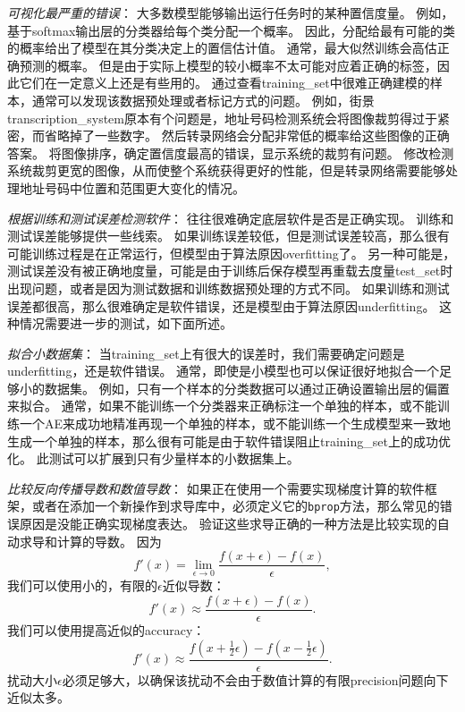 \emph{可视化最严重的错误}：
大多数模型能够输出运行任务时的某种置信度量。
例如，基于\gls{softmax}输出层的分类器给每个类分配一个概率。
因此，分配给最有可能的类的概率给出了模型在其分类决定上的置信估计值。
通常，最大似然训练会高估正确预测的概率。
但是由于实际上模型的较小概率不太可能对应着正确的标签，因此它们在一定意义上还是有些用的。
通过查看\gls{training_set}中很难正确建模的样本，通常可以发现该数据预处理或者标记方式的问题。
例如，街景\gls{transcription_system}原本有个问题是，地址号码检测系统会将图像裁剪得过于紧密，而省略掉了一些数字。
然后转录网络会分配非常低的概率给这些图像的正确答案。
将图像排序，确定置信度最高的错误，显示系统的裁剪有问题。
修改检测系统裁剪更宽的图像，从而使整个系统获得更好的性能，但是转录网络需要能够处理地址号码中位置和范围更大变化的情况。

\emph{根据训练和测试误差检测软件}：
往往很难确定底层软件是否是正确实现。
训练和测试误差能够提供一些线索。
如果训练误差较低，但是测试误差较高，那么很有可能训练过程是在正常运行，但模型由于算法原因\gls{overfitting}了。
另一种可能是，测试误差没有被正确地度量，可能是由于训练后保存模型再重载去度量\gls{test_set}时出现问题，或者是因为测试数据和训练数据预处理的方式不同。
如果训练和测试误差都很高，那么很难确定是软件错误，还是模型由于算法原因\gls{underfitting}。
这种情况需要进一步的测试，如下面所述。


\emph{拟合小数据集}：
当\gls{training_set}上有很大的误差时，我们需要确定问题是\gls{underfitting}，还是软件错误。
通常，即使是小模型也可以保证很好地拟合一个足够小的数据集。
例如，只有一个样本的分类数据可以通过正确设置输出层的偏置来拟合。
通常，如果不能训练一个分类器来正确标注一个单独的样本，或不能训练一个\gls{AE}来成功地精准再现一个单独的样本，或不能训练一个生成模型来一致地生成一个单独的样本，那么很有可能是由于软件错误阻止\gls{training_set}上的成功优化。
此测试可以扩展到只有少量样本的小数据集上。

\emph{比较反向传播导数和数值导数}：
如果正在使用一个需要实现梯度计算的软件框架，或者在添加一个新操作到求导库中，必须定义它的\texttt{bprop}方法，那么常见的错误原因是没能正确实现梯度表达。
验证这些求导正确的一种方法是比较实现的自动求导和计算的导数。
因为
\begin{equation}
	f'(x) = \lim_{\epsilon \to 0} \frac{f(x+\epsilon) - f(x)}{\epsilon},
\end{equation}
我们可以使用小的，有限的$\epsilon$近似导数：
\begin{equation}
	f'(x) \approx \frac{f(x+\epsilon) - f(x)}{\epsilon}.
\end{equation}
我们可以使用提高近似的\gls{accuracy}：
\begin{equation}
	f'(x) \approx \frac{ f(x+\frac{1}{2}\epsilon) - f(x-\frac{1}{2}\epsilon) }{\epsilon}.
\end{equation}
扰动大小$\epsilon$必须足够大，以确保该扰动不会由于数值计算的有限\gls{precision}问题向下近似太多。

